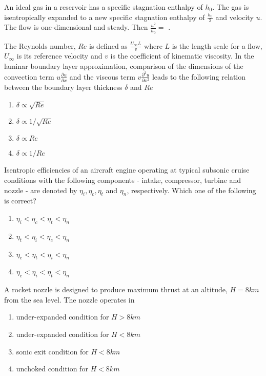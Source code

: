 \item An ideal gas in a reservoir has a specific stagnation enthalpy of $h_0$. The gas is isentropically expanded to a new specific stagnation enthalpy of $\frac{h_{0}}{2}$ and velocity $u$. The flow is one-dimensional and steady. Then $\frac{u^2}{h_{0}}=$ \underline{\hspace{2cm}}.

\item The Reynolds number, $Re$ is defined as $\frac{U_{\infty}L}{v}$ where $L$ is the length scale for a flow, $U_{\infty}$ is its reference velocity and $v$ is the coefficient of kinematic viscosity. In the laminar boundary layer approximation, comparison of the dimensions of the convection term $u\frac{\partial u}{\partial x}$ and the viscous term $v\frac{\partial^{2}u}{\partial x^{2}}$ leads to the following relation between the boundary layer thickness $\delta$ and $Re$

\begin{enumerate}
	\item $\delta \propto \sqrt{Re}$
	\item $\delta \propto 1/\sqrt{Re}$
	\item $\delta \propto Re$
	\item $\delta \propto 1/Re$
\end{enumerate}

\item Isentropic efficiencies of an aircraft engine operating at typical subsonic cruise conditions with the following components - intake, compressor, turbine and nozzle - are denoted by $\eta _i, \eta _c, \eta _t$ and $\eta _n$, respectively. Which one of the following is correct?

\begin{enumerate}
	\item $\eta _i < \eta _c < \eta _t < \eta _n$
	\item $\eta _t < \eta _i < \eta _c < \eta _n$
	\item $\eta _c < \eta _t < \eta _i < \eta _n$
	\item $\eta _c < \eta _i < \eta _t < \eta _n$
\end{enumerate}

\item A rocket nozzle is designed to produce maximum thrust at an altitude, $H = 8km$ from the sea level. The nozzle operates in

\begin{enumerate}
	\item under-expanded condition for $H>8km$
	\item under-expanded condition for $H<8km$
	\item sonic exit condition for $H<8km$
	\item unchoked condition for $H<8km$
\end{enumerate}

